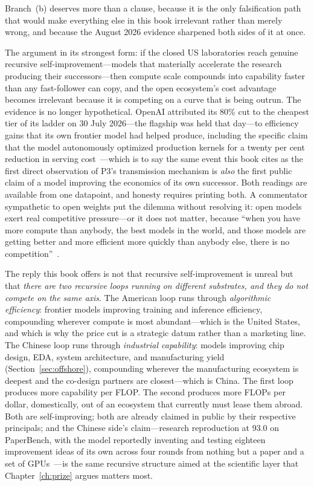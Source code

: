 Branch~(b) deserves more than a clause, because it is the only falsification path that would make everything else in this book irrelevant rather than merely wrong, and because the August 2026 evidence sharpened both sides of it at once.

The argument in its strongest form: if the closed US laboratories reach genuine recursive self-improvement---models that materially accelerate the research producing their successors---then compute scale compounds into capability faster than any fast-follower can copy, and the open ecosystem's cost advantage becomes irrelevant because it is competing on a curve that is being outrun. The evidence is no longer hypothetical. OpenAI attributed its 80\% cut to the cheapest tier of its ladder on 30 July 2026---the flagship was held that day---to efficiency gains that its own frontier model had helped produce, including the specific claim that the model autonomously optimized production kernels for a twenty per cent reduction in serving cost~\cite{openai-cut,openai-luna,berman2026}---which is to say the same event this book cites as the first direct observation of P3's transmission mechanism is \emph{also} the first public claim of a model improving the economics of its own successor. Both readings are available from one datapoint, and honesty requires printing both. A commentator sympathetic to open weights put the dilemma without resolving it: open models exert real competitive pressure---or it does not matter, because ``when you have more compute than anybody, the best models in the world, and those models are getting better and more efficient more quickly than anybody else, there is no competition''~\cite{berman2026}.

The reply this book offers is not that recursive self-improvement is unreal but that \emph{there are two recursive loops running on different substrates, and they do not compete on the same axis}. The American loop runs through \emph{algorithmic efficiency}: frontier models improving training and inference efficiency, compounding wherever compute is most abundant---which is the United States, and which is why the price cut is a strategic datum rather than a marketing line. The Chinese loop runs through \emph{industrial capability}: models improving chip design, EDA, system architecture, and manufacturing yield (Section~\ref{sec:offshore}), compounding wherever the manufacturing ecosystem is deepest and the co-design partners are closest---which is China. The first loop produces more capability per FLOP. The second produces more FLOPs per dollar, domestically, out of an ecosystem that currently must lease them abroad. Both are self-improving; both are already claimed in public by their respective principals; and the Chinese side's claim---research reproduction at 93.0 on PaperBench, with the model reportedly inventing and testing eighteen improvement ideas of its own across four rounds from nothing but a paper and a set of GPUs~\cite{berman2026,qwen38-bench}---is the same recursive structure aimed at the scientific layer that Chapter~\ref{ch:prize} argues matters most.

